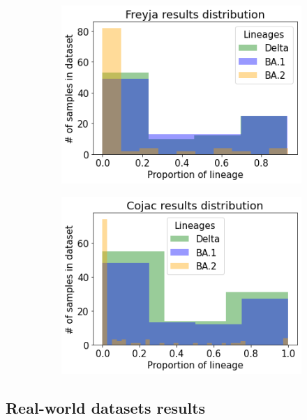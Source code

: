         \begin{figure}[H]
            \centering
            \begin{subfigure}[b]{0.45\textwidth}
            \includegraphics[width=1\textwidth]{figures/results/mock/distr-freyja.png}
            \label{fig:results:mock:dist-freyja-all}
            \end{subfigure}
            \hfill
            \begin{subfigure}[b]{0.45\textwidth}
            \includegraphics[width=1\textwidth]{figures/results/mock/distr-cojac.png}
            \label{fig:results:mock:dist-cojac-all}
            \end{subfigure}
        \end{figure}
        
    
    \subsection{Real-world datasets results} \label{sec:results:real}

\clearpage

